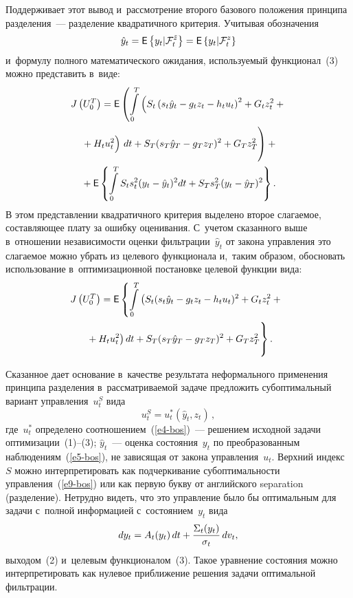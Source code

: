 \begin{multicols}{2}
     Поддерживает этот вывод и~рассмотрение второго базового положения 
принципа разделения~--- разделение квадратичного критерия. Учитывая 
обозначения 
$$
\hat{y}_t= {\sf E}\left\{ y_t\vert \mathcal{F}_t^{\tilde{z}}\right\} =
{\sf E}\left\{ 
y_t\vert \mathcal{F}_t^{z}\right\}
$$ 
и~формулу полного математического ожидания, 
используемый функционал~(3) можно представить в~виде:
\begin{multline*}
 \!J\left( U_0^T\right)={\sf E}\left( \int\limits_0^T 
\left(S_t \left(s_t\hat{y}_t-g_tz_t-h_tu_t\right)^2 +G_tz_t^2+{}\right.\right.\hspace*{-3.52704pt}\\
\left.\left.{}
+H_tu_t^2
\vphantom{S_t\left(\right)^2}
\right)\,dt+S_T(s_T\hat{y}_T-g_Tz_T)^2+G_T 
z_T^2\vphantom{\int\limits_0^T}\right)+{}\\
    {}+{\sf E}\left\{ \int\limits_0^T S_ts_t^2 (y_t-\hat{y}_t)^2dt+
S_Ts_T^2(y_t-\hat{y}_T)^2\right\}.
     \end{multline*} 
     В этом представлении квадратичного критерия выделено второе 
слагаемое, составляющее плату за ошибку оценивания. С~учетом сказанного 
выше в~отношении независимости оценки фильтрации~$\hat{y}_t$ от закона 
управления это слагаемое можно убрать из целевого функционала и,~таким 
образом, обосно\-вать использование в~оптимизационной постановке целевой 
функции вида:
     \begin{multline*}
 \!\!    J\left( U_0^T\right)={\sf E}\left\{ \int\limits_0^T 
\left(S_t(s_t\hat{y}_t-g_tz_t-h_tu_t)^2 +G_tz_t^2+{}\right.\!\right.\\
     \left.\left.{}
    +H_tu_t^2\right)dt+ 
\vphantom{\int\limits_0^T }
S_T(s_T\hat{y}_T-g_Tz_T)^2+G_Tz_T^2\right\}.
     \end{multline*} 
     
     Сказанное дает основание в~качестве результата неформального 
применения принципа разделения в~рассматриваемой задаче предложить 
субоптимальный вариант управления~$u_t^S$ вида
     \begin{equation}
     u_t^S=u_t^*\left( \hat{y}_t, z_t\right)\,,
     \label{e9-bos}
     \end{equation}
где~$u_t^*$ определено соотношением~(\ref{e4-bos})~--- решением исходной 
задачи оптимизации~(1)--(3); $\hat{y}_t$~--- оценка состояния~$y_t$ по 
преобразованным наблюдениям~(\ref{e5-bos}), не зависящая от закона 
управления~$u_t$. \mbox{Верхний} индекс~$S$ можно интерпретировать как 
подчеркивание субоптимальности управления~(\ref{e9-bos}) или как первую 
букву от английского separation (разделение). Нетрудно видеть, что это 
управление было бы оптимальным для задачи с~полной информацией 
с~состоянием~$y_t$ вида 
$$
dy_t= A_t(y_t)\,dt+ 
\displaystyle\frac{\displaystyle \Sigma_t(y_t)\mathstrut}{\displaystyle \sigma_t\mathstrut}\,dv_t,
$$
 выходом~(2) и~целевым функционалом~(3). 
Такое уравнение состояния можно интерпретировать как нулевое 
приближение решения задачи оптимальной фильтрации.
     

\end{multicols}
